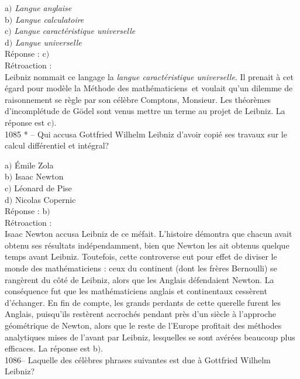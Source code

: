 ﻿\documentclass[letterpaper, 12pt]{article}
\begin{document}
a$)$ {\sl Langue anglaise} \\
b$)$ {\sl Langue calculatoire} \\
c$)$ {\sl Langue caract\'eristique universelle} \\
d$)$ {\sl Langue universelle}\\

R\'eponse : c$)$\\

R\'etroaction :\\
Leibniz nommait ce langage la {\sl langue caract\'eristique
universelle}. Il prenait \`a cet \'egard pour mod\`ele la \og
M\'ethode des math\'ematiciens\fg\ et voulait qu'un dilemme de
raisonnement se r\`egle par son c\'el\`ebre \og Comptons,
Monsieur\fg . Les th\'eor\`emes d'incompl\'etude de G\"odel sont
venus mettre un terme au projet de Leibniz.
La r\'eponse est c$)$.\\

1085 * -- Qui accusa Gottfried Wilhelm Leibniz d'avoir copi\'e ses
travaux sur le calcul diff\'erentiel et int\'egral?

a$)$ \'Emile Zola \\
b$)$ Isaac Newton \\
c$)$ L\'eonard de Pise \\
d$)$ Nicolas Copernic  \\

R\'eponse : b$)$\\

R\'etroaction : \\
Isaac Newton accusa Leibniz de ce m\'efait. L'histoire d\'emontra
que chacun avait obtenu ses r\'esultats ind\'ependam\-ment, bien que
Newton les ait obtenus quelque temps avant Leibniz. Toutefois, cette
controverse eut pour effet de diviser le monde des math\'ematiciens
: ceux du continent (dont les fr\`eres Bernoulli) se rang\`erent du
c\^ot\'e de Leibniz, alors que les Anglais d\'efendaient Newton. La
cons\'equence fut que les math\'ematiciens anglais et continentaux
cess\`erent d'\'echanger. En fin de compte, les grands perdants de
cette querelle furent les Anglais, puisqu'ils rest\`erent
accroch\'es pendant pr\`es d'un si\`ecle \`a l'approche
g\'eom\'etrique de Newton, alors que le reste de l'Europe profitait
des m\'ethodes analytiques mises de l'avant par Leibniz, lesquelles
se sont av\'er\'ees beaucoup plus efficaces.
La r\'eponse est b$)$.\\

1086-- Laquelle des c\'el\`ebres phrases suivantes est due \`a
Gottfried Wilhelm Leibniz?
\end{document}
